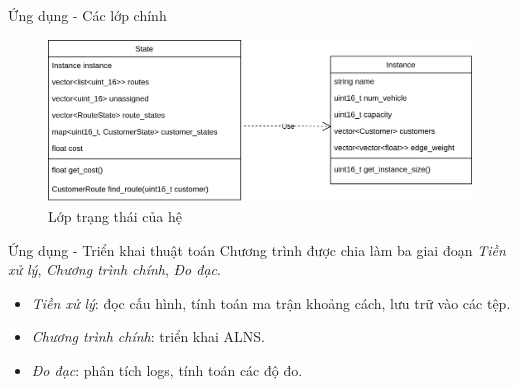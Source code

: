 \begin{frame}{Ứng dụng - Các lớp chính}
  \begin{figure}[H] %
    \centering %
    \includegraphics[width=1\textwidth]{figures/core-object.png}
    \caption{Lớp trạng thái của hệ}
    \label{fig:fg_04}
  \end{figure}
\end{frame}

\begin{frame}{Ứng dụng - Triển khai thuật toán}
  Chương trình được chia làm ba giai đoạn \textit{Tiền xử lý}, \textit{Chương trình chính}, \textit{Đo đạc}.
\begin{itemize}
	\item \textit{Tiền xử lý}: đọc cấu hình, tính toán ma trận khoảng cách, lưu trữ vào các tệp. 
	\item \textit{Chương trình chính}: triển khai ALNS.
	\item \textit{Đo đạc}: phân tích logs, tính toán các độ đo.
\end{itemize}
\end{frame}